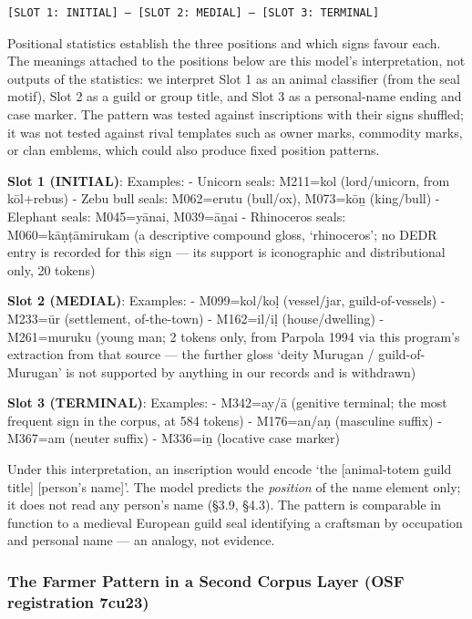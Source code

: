 \documentclass[11pt]{article}
\begin{document}
\begin{verbatim}
[SLOT 1: INITIAL] – [SLOT 2: MEDIAL] – [SLOT 3: TERMINAL]
\end{verbatim}

Positional statistics establish the three positions and which signs favour each. The meanings attached to the positions below are this model's interpretation, not outputs of the statistics: we interpret Slot 1 as an animal classifier (from the seal motif), Slot 2 as a guild or group title, and Slot 3 as a personal-name ending and case marker. The pattern was tested against inscriptions with their signs shuffled; it was not tested against rival templates such as owner marks, commodity marks, or clan emblems, which could also produce fixed position patterns.

\textbf{Slot 1 (INITIAL)}: Examples: - Unicorn seals: M211=kol (lord/unicorn, from
kōl+rebus) - Zebu bull seals: M062=erutu (bull/ox), M073=kōṉ (king/bull)
- Elephant seals: M045=yānai, M039=āṉai - Rhinoceros seals: M060=kāṇṭāmirukam (a descriptive compound gloss, `rhinoceros'; no DEDR entry is recorded for this sign --- its support is iconographic and distributional only, 20 tokens)

\textbf{Slot 2 (MEDIAL)}: Examples: - M099=kol/koḷ (vessel/jar,
guild-of-vessels) - M233=ūr (settlement, of-the-town) - M162=il/iḷ
(house/dwelling) - M261=muruku (young man; 2 tokens only, from Parpola 1994 via this program's extraction from that source --- the further gloss `deity Murugan / guild-of-Murugan' is not supported by anything in our records and is withdrawn)

\textbf{Slot 3 (TERMINAL)}: Examples: - M342=ay/ā (genitive terminal; the most frequent sign in the corpus, at 584
tokens) - M176=an/aṇ (masculine suffix) - M367=am (neuter suffix) -
M336=iṉ (locative case marker)

Under this interpretation, an inscription would encode `the [animal-totem guild title] [person's name]'. The model predicts the \emph{position} of the name element only; it does not read any person's name (§3.9, §4.3). The pattern is comparable in function to a medieval European guild seal identifying a craftsman by occupation and personal name --- an analogy, not evidence.

\subsubsection{The Farmer Pattern in a Second Corpus Layer
(OSF registration 7cu23)}\label{the-farmer-pattern-in-a-second-corpus-layer-spec-052}
\end{document}
